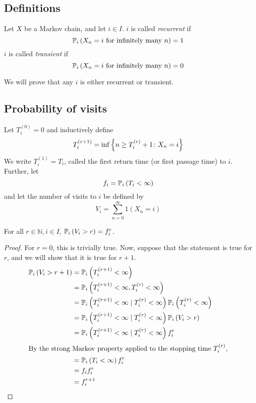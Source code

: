 \subsection{Definitions}
\begin{definition}
	Let \( X \) be a Markov chain, and let \( i \in I \).
	\( i \) is called \textit{recurrent} if
	\[
		\mathbb{P}_{i}\left({X_n = i \text{ for infinitely many } n}\right) = 1
	\]
	\( i \) is called \textit{transient} if
	\[
		\mathbb{P}_{i}\left({X_n = i \text{ for infinitely many } n}\right) = 0
	\]
\end{definition}
\noindent We will prove that any \( i \) is either recurrent or transient.

\subsection{Probability of visits}
\begin{definition}
	Let \( T_i^{(0)} = 0 \) and inductively define
	\[
		T_i^{(r+1)} = \inf \qty{n \geq T_i^{(r)} + 1 \colon X_n = i}
	\]
	We write \( T_i^{(1)} = T_i \), called the first return time (or first passage time) to \( i \).
	Further, let
	\[
		f_i = \mathbb{P}_{i}\left({T_i < \infty}\right)
	\]
	and let the number of visits to \( i \) be defined by
	\[
		V_i = \sum_{n=0}^\infty 1(X_n = i)
	\]
\end{definition}
\begin{lemma}
	For all \( r \in \mathbb N, i \in I \), \( \mathbb{P}_{i}\left({V_i > r}\right) = f_i^r \).
\end{lemma}
\begin{proof}
	For \( r = 0 \), this is trivially true.
	Now, suppose that the statement is true for \( r \), and we will show that it is true for \( r + 1 \).
	\begin{align*}
		\mathbb{P}_{i}\left({V_i > r+1}\right) & = \mathbb{P}_{i}\left({T_i^{(r+1)} < \infty}\right)                                                      \\
		                    & = \mathbb{P}_{i}\left({T_i^{(r+1)} < \infty, T_i^{(r)} < \infty}\right)                                  \\
		                    & = \mathbb{P}_{i}\left({T_i^{(r+1)} < \infty \mid T_i^{(r)} < \infty}\right) \mathbb{P}_{i}\left({T_i^{(r)} < \infty}\right) \\
		                    & = \mathbb{P}_{i}\left({T_i^{(r+1)} < \infty \mid T_i^{(r)} < \infty}\right) \mathbb{P}_{i}\left({V_i > r}\right)            \\
		                    & = \mathbb{P}_{i}\left({T_i^{(r+1)} < \infty \mid T_i^{(r)} < \infty}\right) f_i^r                        \\
		\intertext{By the strong Markov property applied to the stopping time \( T_i^{(r)} \),}
		                    & = \mathbb{P}_{i}\left({T_i < \infty}\right) f_i^r                                                        \\
		                    & = f_i f_i^r                                                                           \\
		                    & = f_i^{r+1}
	\end{align*}
\end{proof}


